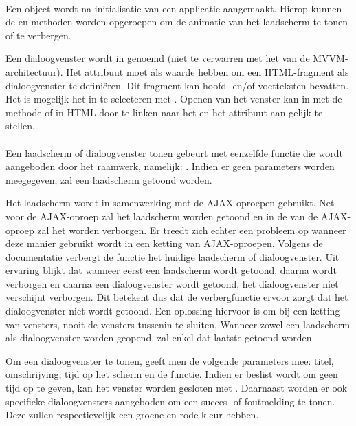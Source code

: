 \paragraph{\kendo}
Een  object wordt na initialisatie van een \kendo{} applicatie aangemaakt.
Hierop kunnen de  en  methoden worden opgeroepen om de animatie van het laadscherm te tonen of te verbergen.

Een dialoogvenster wordt in \kendo{}  genoemd (niet te verwarren met het  van de MVVM-architectuur).
Het attribuut  moet  als waarde hebben om een HTML-fragment als dialoogvenster te definiëren.
Dit fragment kan hoofd- en/of voetteksten bevatten.
Het is mogelijk het  in \js{} te selecteren met .
Openen van het venster kan in \js{} met de  methode of in HTML door te linken naar het  en het  attribuut aan  gelijk te stellen.


\paragraph{\lungo}
Een laadscherm of dialoogvenster tonen gebeurt met eenzelfde functie die wordt aangeboden door het raamwerk, namelijk: .
Indien er geen parameters worden meegegeven, zal een laadscherm getoond worden.

Het laadscherm wordt in samenwerking met de AJAX-oproepen gebruikt.
Net voor de AJAX-oproep zal het laadscherm worden getoond en in de  van de AJAX-oproep zal het worden verborgen.
Er treedt zich echter een probleem op wanneer deze manier gebruikt wordt in een ketting van AJAX-oproepen.
Volgens de documentatie verbergt de functie  het huidige laadscherm of dialoogvenster. 
Uit ervaring blijkt dat wanneer eerst een laadscherm wordt getoond, daarna wordt verborgen en daarna een dialoogvenster wordt getoond, het dialoogvenster niet verschijnt verborgen.
Dit betekent dus dat de verbergfunctie ervoor zorgt dat het dialoogvenster niet wordt getoond.
Een oplossing hiervoor is om bij een ketting van vensters, nooit de vensters tussenin te sluiten.
Wanneer zowel een laadscherm als dialoogvenster worden geopend, zal enkel dat laatste getoond worden.

Om een dialoogvenster te tonen, geeft men de volgende parameters mee: titel, omschrijving, tijd op het scherm en de  functie.
Indien er beslist wordt om geen tijd op te geven, kan het venster worden gesloten met .
Daarnaast worden er ook specifieke dialoogvensters aangeboden om een succes- of foutmelding te tonen.
Deze zullen respectievelijk een groene en rode kleur hebben.


